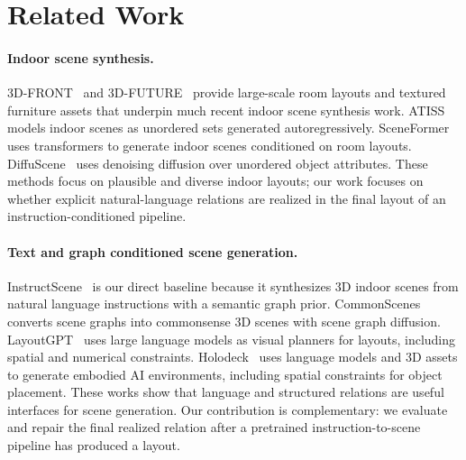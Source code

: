 \documentclass{article}
\begin{document}
\section{Related Work}

\paragraph{Indoor scene synthesis.}
3D-FRONT~\citep{fu20213dfront} and 3D-FUTURE~\citep{fu20203dfuture} provide large-scale room layouts and textured furniture assets that underpin much recent indoor scene synthesis work. ATISS~\citep{paschalidou2021atiss} models indoor scenes as unordered sets generated autoregressively. SceneFormer~\citep{wang2021sceneformer} uses transformers to generate indoor scenes conditioned on room layouts. DiffuScene~\citep{tang2024diffuscene} uses denoising diffusion over unordered object attributes. These methods focus on plausible and diverse indoor layouts; our work focuses on whether explicit natural-language relations are realized in the final layout of an instruction-conditioned pipeline.

\paragraph{Text and graph conditioned scene generation.}
InstructScene~\citep{lin2024instructscene} is our direct baseline because it synthesizes 3D indoor scenes from natural language instructions with a semantic graph prior. CommonScenes~\citep{zhai2023commonscenes} converts scene graphs into commonsense 3D scenes with scene graph diffusion. LayoutGPT~\citep{feng2023layoutgpt} uses large language models as visual planners for layouts, including spatial and numerical constraints. Holodeck~\citep{yang2024holodeck} uses language models and 3D assets to generate embodied AI environments, including spatial constraints for object placement. These works show that language and structured relations are useful interfaces for scene generation. Our contribution is complementary: we evaluate and repair the final realized relation after a pretrained instruction-to-scene pipeline has produced a layout.
\end{document}
